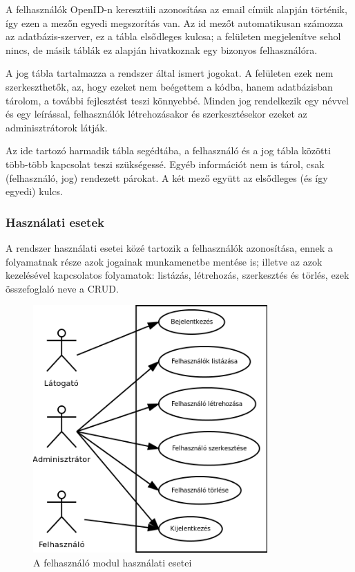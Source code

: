 \documentclass[a4paper,12pt,oneside]{report}
\begin{document}
A felhasználók OpenID-n keresztüli azonosítása az email címük alapján történik, így ezen a mezőn egyedi megszorítás van. Az id mezőt automatikusan számozza az adatbázis-szerver, ez a tábla elsődleges kulcsa; a felületen megjelenítve sehol nincs, de másik táblák ez alapján hivatkoznak egy bizonyos felhasználóra.

A jog tábla tartalmazza a rendszer által ismert jogokat. A felületen ezek nem szerkeszthetők, az, hogy ezeket nem beégettem a kódba, hanem adatbázisban tárolom, a további fejlesztést teszi könnyebbé. Minden jog rendelkezik egy névvel és egy leírással, felhasználók létrehozásakor és szerkesztésekor ezeket az adminisztrátorok látják.

Az ide tartozó harmadik tábla segédtába, a felhasználó és a jog tábla közötti több-több kapcsolat teszi szükségessé. Egyéb információt nem is tárol, csak (felhasználó, jog) rendezett párokat. A két mező együtt az elsődleges (és így egyedi) kulcs.

\subsubsection*{Használati esetek}

A rendszer használati esetei közé tartozik a felhasználók azonosítása, ennek a folyamatnak része azok jogainak munkamenetbe mentése is; illetve az azok kezelésével kapcsolatos folyamatok: listázás, létrehozás, szerkesztés és törlés, ezek összefoglaló neve a CRUD\cite{website:crud}.

\begin{figure}[h]
    \includegraphics[width=0.8\textwidth]{felhasznalo_usecase.png}
    \caption{A felhasználó modul használati esetei}
    \label{fig:felhasznalo_usecase}
\end{figure}
\end{document}
